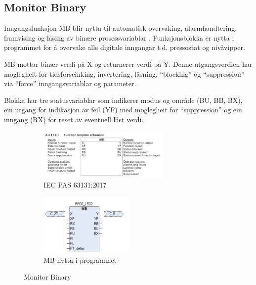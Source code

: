 \newpage

\subsection{Monitor Binary}
Inngangsfunksjon \gls{MB} blir nytta til automatisk overvaking, alarmhandtering, framvising og låsing av binære prosessvariablar \citep{IEC-63131}.
Funksjonsblokka er nytta i programmet for å overvake alle digitale inngangar t.d. pressostat og nivåvipper.

\gls{MB} mottar binær verdi på X og returnerer verdi på Y. \newline
Denne utgangsverdien har moglegheit for tidsforseinking, invertering, låsning, ``blocking'' og ``suppression'' via ``force'' inngangsvariablar og parameter.

Blokka har tre statusvariablar som indikerer modus og område (BU, BB, BX), ein utgang for indikasjon av feil (YF) med moglegheit for ``suppression''
og ein inngang (RX) for reset av eventuell låst verdi. \newline 

\begin{figure}[htbp]
    \centering
    \begin{subfigure}[b]{1\textwidth}
        \centering
        \includegraphics[width=0.7\textwidth]{Bilder/MBBlokkIEC.png}
        \caption{\gls{IEC} \gls{PAS} 63131:2017 \citep{MB}}\label{fig:Monitor Binary blokk IEC}
    \end{subfigure}
    \hfill
    \begin{subfigure}[b]{1\textwidth}
        \centering
        \includegraphics[width=0.5\textwidth]{Bilder/MBBlokkIProgrammet.png}
        \caption{MB nytta i programmet}\label{fig:Monitor Binary blokk i programmet}
    \end{subfigure}
    \caption{Monitor Binary}\label{fig:Monitor Binary}
\end{figure}

